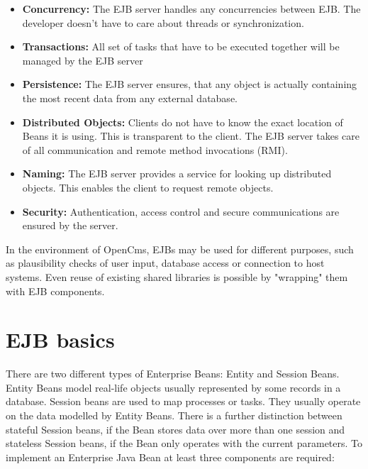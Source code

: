 \begin {itemize}
\item {\bf Concurrency:}
The EJB server handles any concurrencies between EJB. The developer
doesn't have to care about threads or synchronization.
\item {\bf Transactions:}
All set of tasks that have to be executed together will be managed by
the EJB server
\item {\bf Persistence:}
The EJB server ensures, that any object is actually containing the most
recent data from any external database.
\item {\bf Distributed Objects:}
Clients do not have to know the exact location of Beans it is using.
This is transparent to the client. The EJB server takes care of  all
communication and remote method invocations (RMI).
\item {\bf Naming:}
The EJB server provides a service for looking up distributed objects.
This enables the client to request remote objects.
\item {\bf Security:}
Authentication, access control and secure communications are ensured by
the server.
\end{itemize}

In the environment of OpenCms, EJBs may be used for different purposes,
such as plausibility checks of user input, database access or connection
to host systems. Even reuse of existing shared libraries is possible by
{\name "wrapping"} them with EJB components.

\section {EJB basics}
There are two different types of Enterprise Beans: Entity and Session
Beans. Entity Beans model real-life objects usually represented by some
records in a database. Session beans are used to map processes or tasks.
They usually operate on the data modelled by Entity Beans.
There is a further distinction between stateful Session beans, if the
Bean stores data over more than one session and stateless Session beans,
if the Bean only operates with the current parameters.
To implement an Enterprise Java Bean at least three components
are required:

